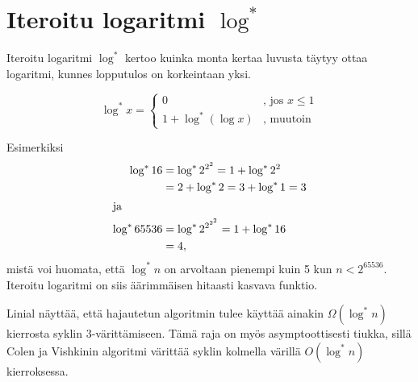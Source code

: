 \documentclass[finnish]{tktltiki2}
\theoremstyle{definition}
\theoremstyle{remark}
\begin{document}
\section*{Iteroitu logaritmi $\log^*$}

Iteroitu logaritmi $\log^*$ kertoo kuinka monta kertaa luvusta täytyy ottaa
logaritmi, kunnes lopputulos on korkeintaan yksi.

\begin{equation*}
    \log^* x =
      \begin{cases}
          0               &\text{, jos } x \leq 1 \\
          1 + \log^* (\log x) &\text{, muutoin}
      \end{cases}
\end{equation*}

Esimerkiksi
%
\begin{align*}
    \log^* 16 &= \log^* 2^{2^2} = 1 + \log^* 2^2 \\
              &= 2+ \log^* 2 = 3 + \log^* 1 = 3 \\
\intertext{ja}
    \log^* 65536 &= \log^* 2^{2^{2^2}} = 1 + \log^* 16 \\
                 &= 4,
\end{align*}
%
mistä voi huomata, että $\log^* n$ on arvoltaan pienempi kuin 5 kun $n <
2^{65536}$. Iteroitu logaritmi on siis äärimmäisen hitaasti kasvava funktio.

Linial näyttää, että hajautetun algoritmin tulee käyttää ainakin $\Omega(\log^*
n)$ kierrosta syklin 3-värittämiseen. Tämä raja on myös asymptoottisesti
tiukka, sillä Colen ja Vishkinin algoritmi värittää syklin kolmella värillä
$O(\log^* n)$ kierroksessa.

%
%
% 
%



\end{document}
